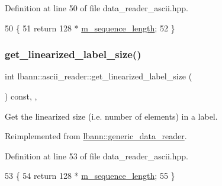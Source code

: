 Definition at line 50 of file data\+\_\+reader\+\_\+ascii.\+hpp.


\begin{DoxyCode}
50                                                 \{
51     \textcolor{keywordflow}{return} 128 * \hyperlink{classlbann_1_1ascii__reader_a5788fa7418a086de968929d0d4cb4fa4}{m\_sequence\_length};
52   \}
\end{DoxyCode}
\mbox{\label{classlbann_1_1ascii__reader_aa997a38db111d3a8a9a0e08169ac9cc3}} 
\subsubsection{\texorpdfstring{get\+\_\+linearized\+\_\+label\+\_\+size()}{get\_linearized\_label\_size()}}
{\footnotesize\ttfamily int lbann\+::ascii\+\_\+reader\+::get\+\_\+linearized\+\_\+label\+\_\+size (\begin{DoxyParamCaption}{ }\end{DoxyParamCaption}) const\hspace{0.3cm}{\ttfamily [inline]}, {\ttfamily [override]}, {\ttfamily [virtual]}}



Get the linearized size (i.\+e. number of elements) in a label. 



Reimplemented from \hyperlink{classlbann_1_1generic__data__reader_a99e8ba4f09fdc86d238ad7c8d2e2bce0}{lbann\+::generic\+\_\+data\+\_\+reader}.



Definition at line 53 of file data\+\_\+reader\+\_\+ascii.\+hpp.


\begin{DoxyCode}
53                                                  \{
54     \textcolor{keywordflow}{return} 128 * \hyperlink{classlbann_1_1ascii__reader_a5788fa7418a086de968929d0d4cb4fa4}{m\_sequence\_length};
55   \}
\end{DoxyCode}
\mbox{\label{classlbann_1_1ascii__reader_aee041430b7ef13c8324393568fa89922}} 
